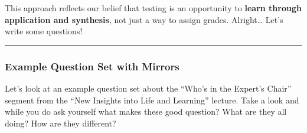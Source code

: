 \documentclass[
]{article}
\begin{document}
This approach reflects our belief that testing is an opportunity to \textbf{learn through application and synthesis}, not just a way to assign grades.
Alright\ldots{} Let's write some questions!

\begin{center}\rule{0.5\linewidth}{0.5pt}\end{center}

\hypertarget{example-question-set-with-mirrors}{%
\subsubsection{Example Question Set with Mirrors}\label{example-question-set-with-mirrors}}

Let's look at an example question set about the ``Who's in the Expert's Chair'' segment from the ``New Insights into Life and Learning'' lecture. Take a look and while you do ask yourself what makes these good question? What are they all doing? How are they different?
\end{document}
